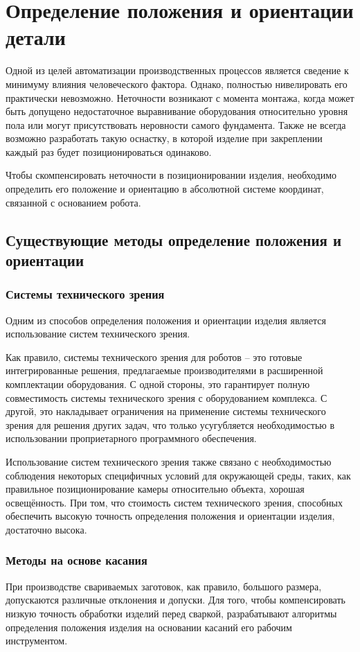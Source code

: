 \chapter{Определение положения и ориентации детали}
Одной из целей автоматизации производственных процессов является сведение к минимуму влияния человеческого фактора.
Однако, полностью нивелировать его практически невозможно.
Неточности возникают с момента монтажа, когда может быть допущено недостаточное выравнивание оборудования относительно уровня пола или могут присутствовать неровности самого фундамента.
Также не всегда возможно разработать такую оснастку, в которой изделие при закреплении каждый раз будет позиционироваться одинаково.

Чтобы скомпенсировать неточности в позиционировании изделия, необходимо определить его положение и ориентацию в абсолютной системе координат, связанной с основанием робота.


\section{Существующие методы определение положения и ориентации}

\subsection{Системы технического зрения}
Одним из способов определения положения и ориентации изделия является использование систем технического зрения.

Как правило, системы технического зрения для роботов -- это готовые интегрированные решения, предлагаемые производителями в расширенной комплектации оборудования.
С одной стороны, это гарантирует полную совместимость системы технического зрения с оборудованием комплекса.
С другой, это накладывает ограничения на применение системы технического зрения для решения других задач, что только усугубляется необходимостью в использовании проприетарного программного обеспечения.

Использование систем технического зрения также связано с необходимостью соблюдения некоторых специфичных условий для окружающей среды, таких, как правильное позиционирование камеры относительно объекта, хорошая освещённость.
При том, что стоимость систем технического зрения, способных обеспечить высокую точность определения положения и ориентации изделия, достаточно высока.

\subsection{Методы на основе касания}
При производстве свариваемых заготовок, как правило, большого размера, допускаются различные отклонения и допуски.
Для того, чтобы компенсировать низкую точность обработки изделий перед сваркой, разрабатывают алгоритмы определения положения изделия на основании касаний его рабочим инструментом.

